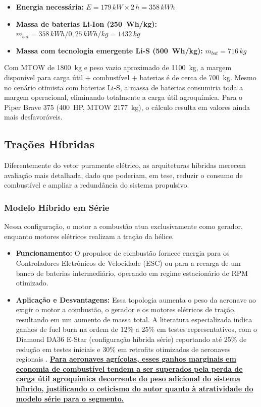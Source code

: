 \documentclass[a4paper,12pt]{article}
\newcommand{\autoeval}[1]{\textbf{\underline{#1}}}
\begin{document}
\begin{itemize}
    \item \textbf{Energia necessária:} $E = 179\,\si{kW} \times 2\,\si{h} = 358\,\si{kWh}$
    \item \textbf{Massa de baterias Li-Ion (\SI{250}{Wh/kg}):} $m_{bat} = 358\,\si{kWh} / 0{,}25\,\si{kWh/kg} = 1432\,\si{kg}$
    \item \textbf{Massa com tecnologia emergente Li-S (\SI{500}{Wh/kg}):} $m_{bat} = 716\,\si{kg}$
\end{itemize}

Com MTOW de \SI{1800}{kg} e peso vazio aproximado de \SI{1100}{kg}, a margem disponível para carga útil + combustível + baterias é de cerca de \SI{700}{kg}. Mesmo no cenário otimista com baterias Li-S, a massa de baterias consumiria toda a margem operacional, eliminando totalmente a carga útil agroquímica. Para o Piper Brave 375 (\SI{400}{HP}, MTOW \SI{2177}{kg}), o cálculo resulta em valores ainda mais desfavoráveis.

\subsection{Trações Híbridas}

Diferentemente do vetor puramente elétrico, as arquiteturas híbridas merecem avaliação mais detalhada, dado que poderiam, em tese, reduzir o consumo de combustível e ampliar a redundância do sistema propulsivo.

\subsubsection{Modelo Híbrido em Série}
Nessa configuração, o motor a combustão atua exclusivamente como gerador, enquanto motores elétricos realizam a tração da hélice.

\begin{itemize}
    \item \textbf{Funcionamento:} O propulsor de combustão fornece energia para os Controladores Eletrônicos de Velocidade (ESC) ou para a recarga de um banco de baterias intermediário, operando em regime estacionário de RPM otimizado.
    \item \textbf{Aplicação e Desvantagens:} Essa topologia aumenta o peso da aeronave ao exigir o motor a combustão, o gerador e os motores elétricos de tração, resultando em um aumento de massa total. A literatura especializada indica ganhos de fuel burn na ordem de 12\% a 25\% em testes representativos, com o Diamond DA36 E-Star (configuração híbrida série) reportando até 25\% de redução em testes iniciais e 30\% em retrofits otimizados de aeronaves regionais \cite{wiki_hybrid_electric, sciencedirect_hybrid}. \autoeval{Para aeronaves agrícolas, esses ganhos marginais em economia de combustível tendem a ser superados pela perda de carga útil agroquímica decorrente do peso adicional do sistema híbrido, justificando o ceticismo do autor quanto à atratividade do modelo série para o segmento.}
\end{itemize}
\end{document}
